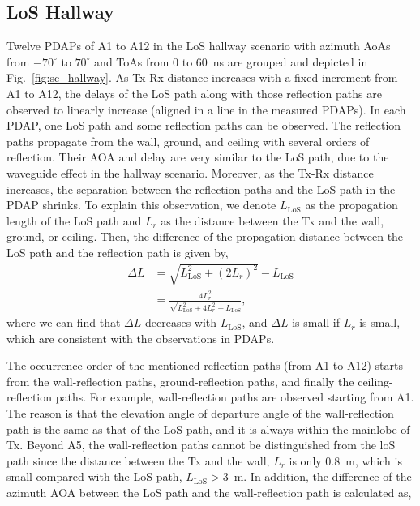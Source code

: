 \documentclass[journal,12pt,draftclsnofoot,onecolumn]{IEEEtran}
\begin{document}
\subsection{LoS Hallway}\label{sec:MPC_LoSHallway}
Twelve PDAPs of A1 to A12 in the LoS hallway scenario with azimuth AoAs from $-70^\circ$ to $70^\circ$ and ToAs from 0 to 60~ns are grouped and depicted in Fig.~\ref{fig:sc_hallway}. As Tx-Rx distance increases with a fixed increment from A1 to A12, the delays of the LoS path along with those reflection paths are observed to linearly increase (aligned in a line in the measured PDAPs). In each PDAP, one LoS path and some reflection paths can be observed. The reflection paths propagate from the wall, ground, and ceiling with several orders of reflection. Their AOA and delay are very similar to the LoS path, due to the waveguide effect in the hallway scenario. Moreover, as the Tx-Rx distance increases, the separation between the reflection paths and the LoS path in the PDAP shrinks. To explain this observation, we denote $L_{\text{LoS}}$ as the propagation length of the LoS path and $L_{r}$ as the distance between the Tx and the wall, ground, or ceiling. Then, the difference of the propagation distance between the LoS path and the reflection path is given by,
\begin{equation}
\begin{split}
    \Delta L&=\sqrt{L^2_{\text{LoS}}+(2L_{r})^2}-L_{\text{LoS}}\\
    &=\frac{4L_r^2}{\sqrt{L_{\text{LoS}}^2+4L_r^2}+L_{\text{LoS}}},
\end{split}
\end{equation}
where we can find that $\Delta L$ decreases with $L_{\text{LoS}}$, and $\Delta L$ is small if $L_r$ is small, which are consistent with the observations in PDAPs. 
\par The occurrence order of the mentioned reflection paths (from A1 to A12) starts from the wall-reflection paths, ground-reflection paths, and finally the ceiling-reflection paths. For example, wall-reflection paths are observed starting from A1. The reason is that the elevation angle of departure angle of the wall-reflection path is the same as that of the LoS path, and it is always within the mainlobe of Tx. Beyond A5, the wall-reflection paths cannot be distinguished from the loS path since the distance between the Tx and the wall, $L_r$ is only 0.8~m, which is small compared with the LoS path, $L_{\text{LoS}}>3$~m. In addition, the difference of the azimuth AOA between the LoS path and the wall-reflection path is calculated as,
\end{document}
